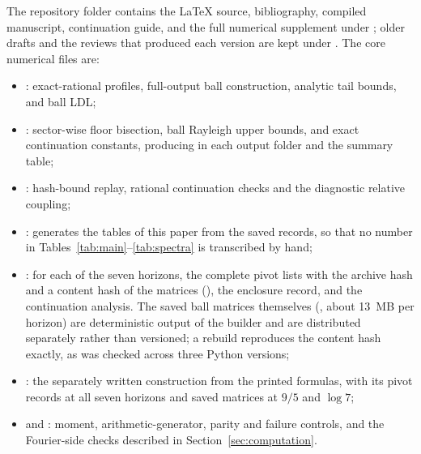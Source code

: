 \documentclass[11pt]{article}
\numberwithin{equation}{section}
\theoremstyle{definition}
\theoremstyle{remark}
\begin{document}
The repository folder  contains the LaTeX source,
bibliography, compiled manuscript, continuation guide, and the full numerical
supplement under ; older drafts and the reviews that produced
each version are kept under . The core numerical files are:
\begin{itemize}
\item {}: exact-rational profiles, full-output ball
  construction, analytic tail bounds, and ball LDL;
\item {}: sector-wise floor bisection, ball
  Rayleigh upper bounds, and exact continuation constants, producing
   in each output folder and the summary table;
\item {}: hash-bound replay, rational continuation
  checks and the diagnostic relative coupling;
\item {}: generates the tables of this paper from the
  saved records, so that no number in Tables~\ref{tab:main}--\ref{tab:spectra}
  is transcribed by hand;
\item {}: for each of the seven horizons, the
  complete pivot lists with the archive hash and a content hash of the matrices
  (), the enclosure record, and the continuation
  analysis. The saved ball matrices themselves (,
  about 13~MB per horizon) are deterministic output of the builder and are
  distributed separately rather than versioned; a rebuild reproduces the content
  hash exactly, as was checked across three Python versions;
\item {}: the separately written construction from
  the printed formulas, with its pivot records at all seven horizons and saved
  matrices at $9/5$ and $\log7$;
\item {} and : moment,
  arithmetic-generator, parity and failure controls, and the Fourier-side
  checks described in Section~\ref{sec:computation}.
\end{itemize}
\end{document}
